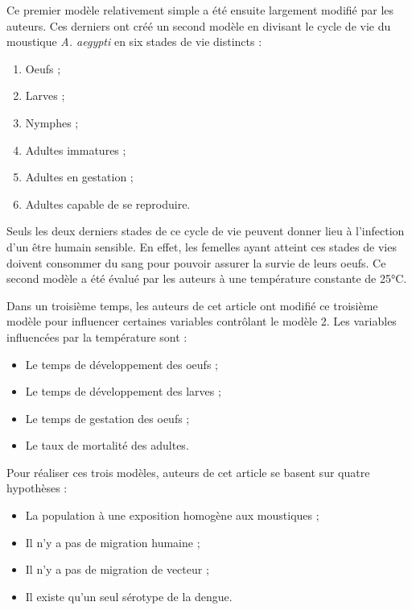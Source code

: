 \documentclass[
  12pt,
  french,
  oneside]{article}
\providecommand{\tightlist}{%
  \setlength{\itemsep}{0pt}\setlength{\parskip}{0pt}}
\begin{document}
Ce premier modèle relativement simple a été ensuite largement modifié
par les auteurs. Ces derniers ont créé un second modèle en divisant le
cycle de vie du moustique \emph{A. aegypti} en six stades de vie
distincts :

\begin{enumerate}
\def\labelenumi{\arabic{enumi}.}
\tightlist
\item
  Oeufs ;
\item
  Larves ;
\item
  Nymphes ;
\item
  Adultes immatures ;
\item
  Adultes en gestation ;
\item
  Adultes capable de se reproduire.
\end{enumerate}

Seuls les deux derniers stades de ce cycle de vie peuvent donner lieu à
l'infection d'un être humain sensible. En effet, les femelles ayant
atteint ces stades de vies doivent consommer du sang pour pouvoir
assurer la survie de leurs oeufs. Ce second modèle a été évalué par les
auteurs à une température constante de 25°C.

Dans un troisième temps, les auteurs de cet article ont modifié ce
troisième modèle pour influencer certaines variables contrôlant le
modèle 2. Les variables influencées par la température sont :

\begin{itemize}
\tightlist
\item
  Le temps de développement des oeufs ;
\item
  Le temps de développement des larves ;
\item
  Le temps de gestation des oeufs ;
\item
  Le taux de mortalité des adultes.
\end{itemize}

Pour réaliser ces trois modèles, auteurs de cet article se basent sur
quatre hypothèses :

\begin{itemize}
\tightlist
\item
  La population à une exposition homogène aux moustiques ;
\item
  Il n'y a pas de migration humaine ;
\item
  Il n'y a pas de migration de vecteur ;
\item
  Il existe qu'un seul sérotype de la dengue.
\end{itemize}
\end{document}
